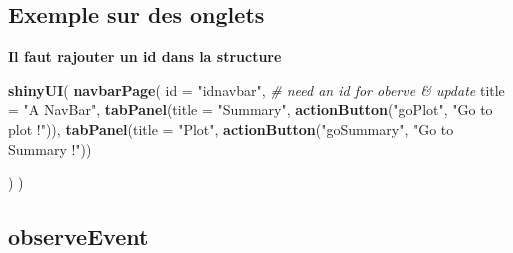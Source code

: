 \documentclass[
]{article}
\newenvironment{Shaded}{\begin{snugshade}}{\end{snugshade}}
\newcommand{\AttributeTok}[1]{\textcolor[rgb]{0.13,0.29,0.53}{#1}}
\newcommand{\CommentTok}[1]{\textcolor[rgb]{0.56,0.35,0.01}{\textit{#1}}}
\newcommand{\ControlFlowTok}[1]{\textcolor[rgb]{0.13,0.29,0.53}{\textbf{#1}}}
\newcommand{\FunctionTok}[1]{\textcolor[rgb]{0.13,0.29,0.53}{\textbf{#1}}}
\newcommand{\NormalTok}[1]{#1}
\newcommand{\SpecialCharTok}[1]{\textcolor[rgb]{0.81,0.36,0.00}{\textbf{#1}}}
\newcommand{\StringTok}[1]{\textcolor[rgb]{0.31,0.60,0.02}{#1}}
\begin{document}
\hypertarget{exemple-sur-des-onglets}{%
\subsection{Exemple sur des onglets}\label{exemple-sur-des-onglets}}

\textbf{Il faut rajouter un id dans la structure}

\begin{Shaded}
\begin{Highlighting}[]
\FunctionTok{shinyUI}\NormalTok{(}
  \FunctionTok{navbarPage}\NormalTok{(}
    \AttributeTok{id =} \StringTok{"idnavbar"}\NormalTok{, }\CommentTok{\# need an id for oberve \& update}
    \AttributeTok{title =} \StringTok{"A NavBar"}\NormalTok{,}
    \FunctionTok{tabPanel}\NormalTok{(}\AttributeTok{title =} \StringTok{"Summary"}\NormalTok{,}
             \FunctionTok{actionButton}\NormalTok{(}\StringTok{"goPlot"}\NormalTok{, }\StringTok{"Go to plot !"}\NormalTok{)),}
    \FunctionTok{tabPanel}\NormalTok{(}\AttributeTok{title =} \StringTok{"Plot"}\NormalTok{,}
             \FunctionTok{actionButton}\NormalTok{(}\StringTok{"goSummary"}\NormalTok{, }\StringTok{"Go to Summary !"}\NormalTok{))}
    
\NormalTok{  )}
\NormalTok{)}
\end{Highlighting}
\end{Shaded}

\begin{Shaded}
\end{Shaded}

\hypertarget{observeevent}{%
\subsection{observeEvent}\label{observeevent}}
\end{document}
